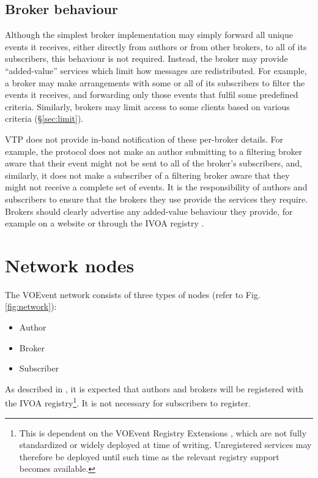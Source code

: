 \documentclass[a4paper,11pt]{ivoa}
\begin{document}
\subsection{Broker behaviour}
\label{sec:common:broker}

Although the simplest broker implementation may simply forward all unique
events it receives, either directly from authors or from other brokers, to all
of its subscribers, this behaviour is not required. Instead, the broker may
provide ``added-value'' services which limit how messages are redistributed.
For example, a broker may make arrangements with some or all of its
subscribers to filter the events it receives, and forwarding only those events
that fulfil some predefined criteria. Similarly, brokers may limit access to
some clients based on various criteria (\S\ref{sec:limit}).

VTP does not provide in-band notification of these per-broker details. For
example, the protocol does not make an author submitting to a filtering broker
aware that their event might not be sent to all of the broker's subscribers,
and, similarly, it does not make a subscriber of a filtering broker aware that
they might not receive a complete set of events. It is the responsibility of
authors and subscribers to ensure that the brokers they use provide the
services they require. Brokers should clearly advertise any added-value
behaviour they provide, for example on a website or through the IVOA registry
\citep{note:VOARCH}.

\section{Network nodes}
\label{sec:node}

The VOEvent network consists of three types of nodes (refer to Fig.
\ref{fig:network}):

\begin{itemize}
    \item{Author}
    \item{Broker}
    \item{Subscriber}
\end{itemize}

As described in \citet{std:VOEVENT2}, it is expected that authors and brokers
will be registered with the IVOA registry\footnote{This is dependent on the
VOEvent Registry Extensions \citep{std:VOEventRegExt}, which are not fully
standardized or widely deployed at time of writing. Unregistered services may
therefore be deployed until such time as the relevant registry support becomes
available.}. It is not necessary for subscribers to register.
\end{document}
